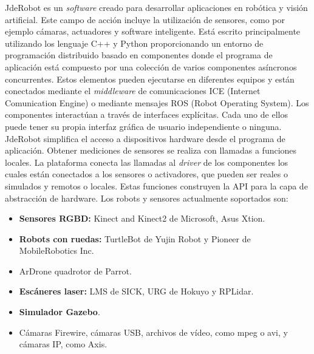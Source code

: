 \documentclass[a4paper, 12pt, spanish, chapterprefix, numbers=noenddot]{book}
\begin{document}
JdeRobot\cite{JdeRobot} es un \textit{software} creado para desarrollar aplicaciones en robótica y visión artificial. Este campo de acción incluye la utilización de sensores, como por ejemplo cámaras, actuadores y software inteligente. Está escrito principalmente utilizando los lenguaje C++ y Python proporcionando un entorno de programación distribuido basado en componentes donde el programa de aplicación está compuesto por una colección de varios componentes asíncronos concurrentes. Estos elementos pueden ejecutarse en diferentes equipos y están conectados mediante el \textit{middleware} de comunicaciones ICE (Internet Comunication Engine) o mediante mensajes ROS (Robot Operating System). Los componentes interactúan a través de interfaces explícitas. Cada uno de ellos puede tener su propia interfaz gráfica de usuario independiente o ninguna.\\

JdeRobot simplifica el acceso a dispositivos hardware desde el programa de aplicación. Obtener mediciones de sensores se realiza con llamadas a funciones locales. La plataforma conecta las llamadas al \textit{driver} de los componentes los cuales están conectados a los sensores o activadores, que pueden ser reales o simulados y remotos o locales. Estas funciones construyen la API para la capa de abstracción de hardware. Los robots y sensores actualmente soportados son:

\begin{itemize}
\item \textbf{Sensores RGBD:} Kinect and Kinect2 de Microsoft, Asus Xtion.
\item \textbf{Robots con ruedas:} TurtleBot de Yujin Robot y Pioneer de MobileRobotics Inc.
\item ArDrone quadrotor de Parrot.
\item \textbf{Escáneres laser:} LMS de SICK, URG de Hokuyo y RPLidar.
\item \textbf{Simulador Gazebo}.
\item Cámaras Firewire, cámaras USB, archivos de vídeo, como mpeg o avi, y cámaras IP, como Axis.
\end{itemize}

\begin{comment}
JdeRobot incluye varias herramientas de programación de robots y bibliotecas. En primer lugar, teleespectadores y teleoperadores para varios robots y sus sensores y motores. En segundo lugar, un componente de calibración de cámara y una herramienta de tunning para filtros de color. En tercer lugar, una herramienta llamada VisualHFSM para la programación del comportamiento del robot utilizando la jerarquía Finite State Machines. Además, también proporciona una biblioteca para desarrollar controladores difusos y otra para la geometría proyectiva y el procesamiento de la visión por computadora.\\
\end{comment}
\end{document}
